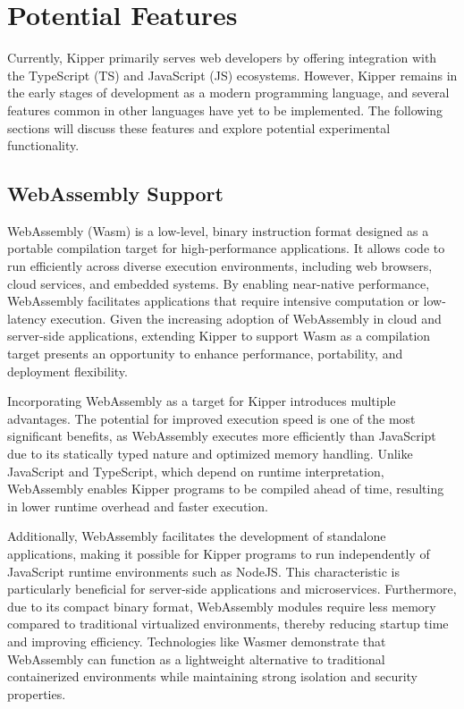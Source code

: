 \section{Potential Features}
\label{sec:future}

Currently, Kipper primarily serves web developers by offering integration with the TypeScript (TS) and JavaScript (JS) ecosystems. However, Kipper remains in the early stages of development as a modern programming language, and several features common in other languages have yet to be implemented. The following sections will discuss these features and explore potential experimental functionality.

\subsection{WebAssembly Support}
WebAssembly (Wasm) is a low-level, binary instruction format designed as a portable compilation target for high-performance applications. It allows code to run efficiently across diverse execution environments, including web browsers, cloud services, and embedded systems. By enabling near-native performance, WebAssembly facilitates applications that require intensive computation or low-latency execution. Given the increasing adoption of WebAssembly in cloud and server-side applications, extending Kipper to support Wasm as a compilation target presents an opportunity to enhance performance, portability, and deployment flexibility.

Incorporating WebAssembly as a target for Kipper introduces multiple advantages. The potential for improved execution speed is one of the most significant benefits, as WebAssembly executes more efficiently than JavaScript due to its statically typed nature and optimized memory handling. Unlike JavaScript and TypeScript, which depend on runtime interpretation, WebAssembly enables Kipper programs to be compiled ahead of time, resulting in lower runtime overhead and faster execution.

Additionally, WebAssembly facilitates the development of standalone applications, making it possible for Kipper programs to run independently of JavaScript runtime environments such as NodeJS. This characteristic is particularly beneficial for server-side applications and microservices. Furthermore, due to its compact binary format, WebAssembly modules require less memory compared to traditional virtualized environments, thereby reducing startup time and improving efficiency. Technologies like Wasmer demonstrate that WebAssembly can function as a lightweight alternative to traditional containerized environments while maintaining strong isolation and security properties.

